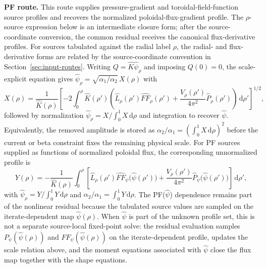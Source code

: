 \documentclass[final, 3p, times]{elsarticle}
\newcommand{\routeclosure}[1]{\par\medskip\noindent\textbf{#1.}\quad}
\begin{document}
\routeclosure{PF route}
This route supplies pressure-gradient and toroidal-field-function source profiles and recovers the normalized poloidal-flux-gradient profile. The $\rho$-source expression below is an intermediate closure form; after the source-coordinate conversion, the common residual receives the canonical flux-derivative profiles. For sources tabulated against the radial label $\rho$, the radial- and flux-derivative forms are related by the source-coordinate convention in Section~\ref{sec:input-routes}. Writing $Q=\hat{K}\hat{\psi}_\rho$ and imposing $Q(0)=0$, the scale-explicit equation gives $\hat{\psi}_\rho=\sqrt{\alpha_1/\alpha_2}\,X(\rho)$ with
\begin{equation*}
    X(\rho)=
    \frac{1}{\hat{K}(\rho)}
    \left[-2\int_0^\rho\hat{K}(\rho')
        \left(\hat{L}_\rho(\rho')\hat{FF}_\rho(\rho')
        +\frac{V_\rho(\rho')}{4\pi^2}\hat{P}_\rho(\rho')
        \right)\,\mathrm{d}\rho'\right]^{1/2},
\end{equation*}
followed by normalization $\hat{\psi}_\rho=X/\int_0^1X\,\mathrm{d}\rho$ and integration to recover $\hat{\psi}$. Equivalently, the removed amplitude is stored as $\alpha_2/\alpha_1=(\int_0^1X\,\mathrm{d}\rho)^2$ before the current or beta constraint fixes the remaining physical scale. For PF sources supplied as functions of normalized poloidal flux, the corresponding unnormalized profile is
\begin{equation*}
    Y(\rho)
    =-\frac{1}{\hat{K}(\rho)}\int_0^\rho\left[
        \hat{L}_\rho(\rho')\hat{FF}_\psi\bigl(\hat{\psi}(\rho')\bigr)
        +\frac{V_\rho(\rho')}{4\pi^2}
        \hat{P}_\psi\bigl(\hat{\psi}(\rho')\bigr)
        \right] \,\mathrm{d}\rho',
\end{equation*}
with $\hat{\psi}_\rho=Y/\int_0^1Y\,\mathrm{d}\rho$ and $\alpha_2/\alpha_1=\int_0^1Y\,\mathrm{d}\rho$. The PF($\hat{\psi}$) dependence remains part of the nonlinear residual because the tabulated source values are sampled on the iterate-dependent map $\hat{\psi}(\rho)$. When $\hat{\psi}$ is part of the unknown profile set, this is not a separate source-local fixed-point solve: the residual evaluation samples $P_\psi(\hat{\psi}(\rho))$ and $FF_\psi(\hat{\psi}(\rho))$ on the iterate-dependent profile, updates the scale relation above, and the moment equations associated with $\hat{\psi}$ close the flux map together with the shape equations.
\end{document}

